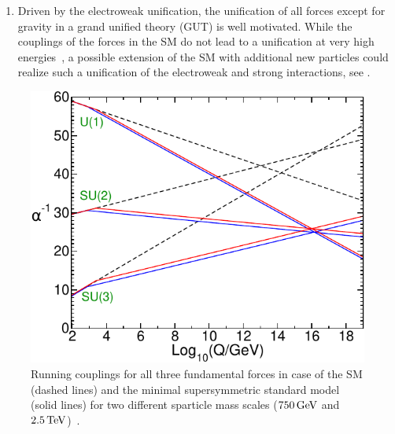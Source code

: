 \begin{enumerate}
 \item Driven by the electroweak unification, the unification of all forces except for gravity in a grand unified theory (GUT) is well motivated. While the couplings of the forces in the SM do not lead to a unification at very high energies~\cite{PDG}, a possible extension of the SM with additional new particles could realize such a unification of the electroweak and strong interactions, see .
\end{enumerate}
\begin{figure}
 \centering
 \includegraphics[width=\pairwidth]{figures/general/couplings}
 \caption{Running couplings for all three fundamental forces in case of the SM (dashed lines) and the minimal supersymmetric standard model (solid lines) for two different sparticle mass scales ($750\,\text{Ge\hspace{-.08em}V}$ and $2.5\,\text{Te\hspace{-.08em}V}$)~\cite{SUSYPrimer}.}
 \label{fig:couplings}
\end{figure}



